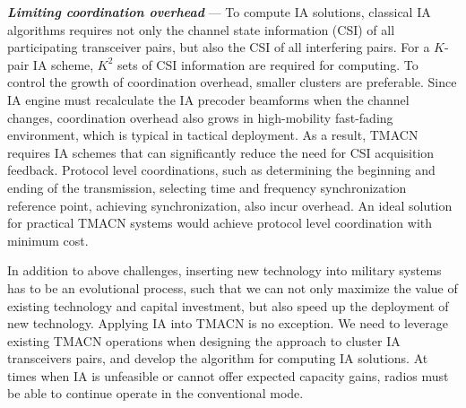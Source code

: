 \documentclass[letterpaper,11pt]{article}
\begin{document}
{\textbf{\textit{Limiting coordination overhead}}} --- To compute IA solutions, classical IA algorithms requires not only the channel state information (CSI) of all participating transceiver pairs, but also the CSI of all interfering pairs. For a $K$-pair IA scheme, $K^2$ sets of CSI information are required for computing. To control the growth of coordination overhead, smaller clusters are preferable. Since IA engine must recalculate the IA precoder beamforms when the channel changes, coordination overhead also grows in high-mobility fast-fading environment, which is typical in tactical deployment. As a result, TMACN requires IA schemes that can significantly reduce the need for CSI acquisition feedback. Protocol level coordinations, such as determining the beginning and ending of the transmission, selecting time and frequency synchronization reference point, achieving synchronization, also incur overhead. An ideal solution for practical TMACN systems would achieve protocol level coordination with minimum cost.

In addition to above challenges, inserting new technology into military systems has to be an evolutional process, such that we can not only maximize the value of existing technology and capital investment, but also speed up the deployment of new technology. Applying IA into TMACN is no exception. We need to leverage existing TMACN operations when designing the approach to cluster IA transceivers pairs, and develop the algorithm for computing IA solutions. At times when IA is unfeasible or cannot offer expected capacity gains, radios must be able to continue operate in the conventional mode.

\end{document}
